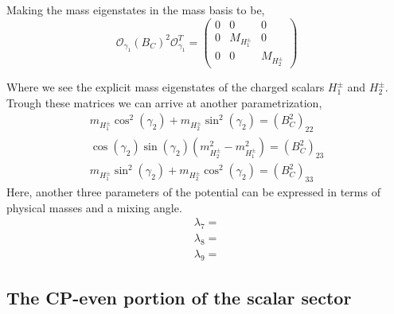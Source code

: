 Making the mass eigenstates in the mass basis to be, 
\begin{equation}
\mathcal{O}_{\gamma_1} \left( B_C \right)^2 \mathcal{O}_{\gamma_1}^T   = \begin{pmatrix}
0 & 0 & 0 \\ 
0 & M_{H_1^\pm} & 0 \\ 
0 & 0 & M_{H_2^\pm}
\end{pmatrix} 
\end{equation}
\begin{comment}
{ \color{red} Power gap }

Both the equations for the diagonalized masses can be utilized to reach a parametrization of some scalar couplings,
\begin{equation}
\begin{split} 
\lambda_7 = \\
\lambda_8 = \\
\lambda_9 = 
\end{split} 
\end{equation}
Further combination with the equation for $\mu_{23}$ and $\lambda_{10}$ yields more terms of the potential expressed as a function of physical masses and respective mixing angles. 
\end{comment} 
Where we see the explicit mass eigenstates of the charged scalars $H^\pm_1$ and $H^\pm_2$. Trough these matrices we can arrive at another parametrization, 
\begin{equation}
\begin{split}
m_{H^\pm_1} \cos^2(\gamma_2) + m_{H^\pm_2}  \sin^2(\gamma_2) = \left( B_C^2 \right)_{22}   \\
\cos(\gamma_2)\sin(\gamma_2)( m_{H^\pm_2}^2 - m_{H^\pm_1}^2  )  = \left( B_C^2 \right)_{23} \\ 
m_{H^\pm_1} \sin^2(\gamma_2) + m_{H^\pm_2}  \cos^2(\gamma_2) = \left( B_C^2 \right)_{33}
\end{split} 
\end{equation}
Here, another three parameters of the potential can be
expressed in terms of physical masses and a mixing angle.
\begin{equation}
\begin{gathered}
\lambda_7 = \\
\lambda_8 = \\
\lambda_9 = 
\end{gathered}
\end{equation}

\subsection{The CP-even portion of the scalar sector}

